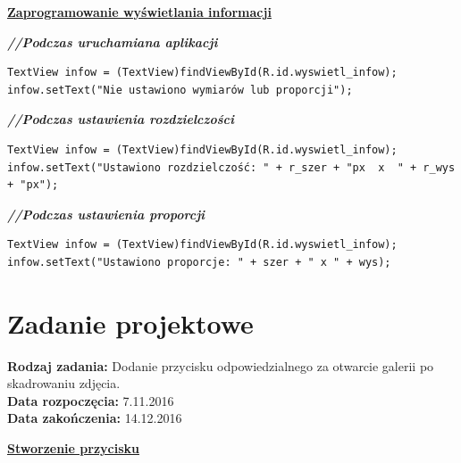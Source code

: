 \begin{center}
\underline{\textbf{Zaprogramowanie wyświetlania informacji}}
\end{center}


\textit{\textbf{//Podczas uruchamiana aplikacji}}
\begin{verbatim}
TextView infow = (TextView)findViewById(R.id.wyswietl_infow);
infow.setText("Nie ustawiono wymiarów lub proporcji");
\end{verbatim}

\textit{\textbf{//Podczas ustawienia rozdzielczości}}
\begin{verbatim}
TextView infow = (TextView)findViewById(R.id.wyswietl_infow);
infow.setText("Ustawiono rozdzielczość: " + r_szer + "px  x  " + r_wys + "px");
\end{verbatim}

\textit{\textbf{//Podczas ustawienia proporcji}}
\begin{verbatim}
TextView infow = (TextView)findViewById(R.id.wyswietl_infow);
infow.setText("Ustawiono proporcje: " + szer + " x " + wys);
\end{verbatim}

\section{Zadanie projektowe}
\noindent\textbf{Rodzaj zadania:}   Dodanie przycisku odpowiedzialnego za otwarcie galerii po skadrowaniu zdjęcia.\\

\noindent\textbf{Data rozpoczęcia:} 7.11.2016\\

\noindent\textbf{Data zakończenia:} 14.12.2016\\

\begin{center}
\underline{\textbf{Stworzenie przycisku}}
\end{center}


